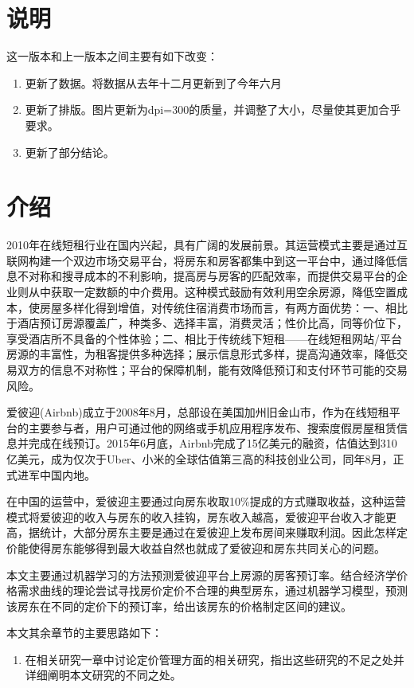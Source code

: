 \documentclass{article}
\begin{document}
\begin{multicols}{2}
\section{说明}
这一版本和上一版本之间主要有如下改变：
\begin{enumerate}
	\item 更新了数据。将数据从去年十二月更新到了今年六月
	\item 更新了排版。图片更新为dpi=300的质量，并调整了大小，尽量使其更加合乎要求。
	\item 更新了部分结论。
\end{enumerate}
\section{介绍}
2010年在线短租行业在国内兴起，具有广阔的发展前景。其运营模式主要是通过互联网构建一个双边市场交易平台，将房东和房客都集中到这一平台中，通过降低信息不对称和搜寻成本的不利影响，提高房与房客的匹配效率，而提供交易平台的企业则从中获取一定数额的中介费用。这种模式鼓励有效利用空余房源，降低空置成本，使房屋多样化得到增值，对传统住宿消费市场而言，有两方面优势：一、相比于酒店预订房源覆盖广，种类多、选择丰富，消费灵活；性价比高，同等价位下，享受酒店所不具备的个性体验；二、相比于传统线下短租——在线短租网站/平台房源的丰富性，为租客提供多种选择；展示信息形式多样，提高沟通效率，降低交易双方的信息不对称性；平台的保障机制，能有效降低预订和支付环节可能的交易风险。
\par 爱彼迎(Airbnb)成立于2008年8月，总部设在美国加州旧金山市，作为在线短租平台的主要参与者，用户可通过他的网络或手机应用程序发布、搜索度假房屋租赁信息并完成在线预订。2015年6月底，Airbnb完成了15亿美元的融资，估值达到310亿美元，成为仅次于Uber、小米的全球估值第三高的科技创业公司，同年8月，正式进军中国内地。\cite{中国在线短租行业发展报告}
\par 在中国的运营中，爱彼迎主要通过向房东收取10\%提成的方式赚取收益，这种运营模式将爱彼迎的收入与房东的收入挂钩，房东收入越高，爱彼迎平台收入才能更高，据统计，大部分房东主要是通过在爱彼迎上发布房间来赚取利润。因此怎样定价能使得房东能够得到最大收益自然也就成了爱彼迎和房东共同关心的问题。
\par 本文主要通过机器学习的方法预测爱彼迎平台上房源的房客预订率。结合经济学价格需求曲线的理论尝试寻找房价定价不合理的典型房东，通过机器学习模型，预测该房东在不同的定价下的预订率，给出该房东的价格制定区间的建议。
\par 本文其余章节的主要思路如下：
\begin{enumerate}
	\item 在相关研究一章中讨论定价管理方面的相关研究，指出这些研究的不足之处并详细阐明本文研究的不同之处。

\end{enumerate}
\end{multicols}
\end{document}
